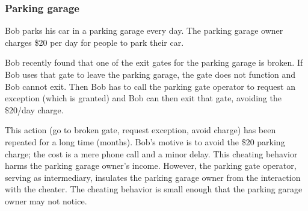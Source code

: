 \subsubsection{Parking garage}

\begin{mdframed}
Bob parks his car in a parking garage every day. 
The parking garage owner charges \$20 per day for people to park their car.

Bob recently found that one of the exit gates for the parking garage is broken. If Bob uses that gate to leave the parking garage, the gate does not function and Bob cannot exit. Then Bob has to call the parking gate operator to request an exception (which is granted) and Bob can then exit that gate, avoiding the \$20/day charge.

This action (go to broken gate, request exception, avoid charge) has been repeated for a long time (months). Bob's motive is to avoid the \$20 parking charge; the cost is a mere phone call and a minor delay. This cheating behavior harms the parking garage owner's income. However, the parking gate operator, serving as intermediary, insulates the parking garage owner from the interaction with the cheater. The cheating behavior is small enough that the parking garage owner may not notice.
\end{mdframed}
